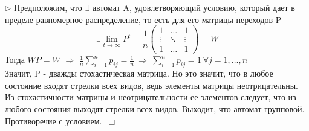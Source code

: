 \documentclass[12pt]{article}
\begin{document}
$\triangleright$ Предположим, что $\exists$ автомат A, удовлетворяющий условию, который дает в пределе равномерное распределение, то есть для его матрицы переходов P $$\exists\lim_{t\to\infty}P^t = \frac{1}{n}\left(\begin{array}{ccc}
1 & \dots & 1\\
\vdots & \ddots & \vdots\\
1 & \dots & 1
\end{array}\right)=W$$
Тогда $WP=W$ $\Rightarrow$ $\frac{1}{n}\sum_{i=1}^np_{ij}=\frac{1}{n}\ \Rightarrow\ \sum_{i=1}^np_{ij}=1\ \forall j=1,\dots,n$
\\ Значит, P - дважды стохастическая матрица. Но это значит, что в любое состояние входят стрелки всех видов, ведь элементы матрицы неотрицательны. Из стохастичности матрицы и неотрицательности ее элементов следует, что из любого состояния выходят стрелки всех видов. Выходит, что автомат групповой. Противоречие с условием.\ $\Box$
\end{document}
